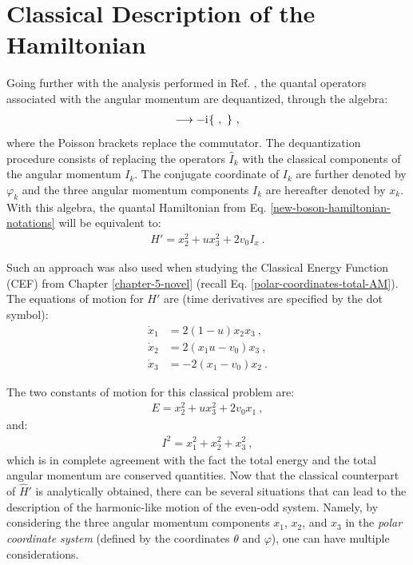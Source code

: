\section{Classical Description of the Hamiltonian}
\label{classical-description-new-boson-section}

Going further with the analysis performed in Ref. \cite{raduta2020new}, the quantal operators associated with the angular momentum are dequantized, through the algebra:
\begin{align}
    [\ ,\ ] \longrightarrow -\iu\{\ ,\ \}\ ,
\end{align}
where the Poisson brackets replace the commutator. The dequantization procedure consists of replacing the operators $\hat{I}_k$ with the classical components of the angular momentum $I_k$. The conjugate coordinate of $I_k$ are further denoted by $\varphi_k$ and the three angular momentum components $I_k$ are hereafter denoted by $x_k$. With this algebra, the quantal Hamiltonian from Eq. \ref{new-boson-hamiltonian-notations} will be equivalent to:
\begin{align}
    H'=x_2^2+ux_3^2+2v_0I_x\ .
    \label{new-boson-h-prime-classical}
\end{align}

Such an approach was also used when studying the Classical Energy Function (CEF) from Chapter \ref{chapter-5-novel} (recall Eq. \ref{polar-coordinates-total-AM}). The equations of motion for $H'$ are (time derivatives are specified by the dot symbol):
\begin{align}
    \dot{x}_1&=2(1-u)x_2x_3\ ,\nonumber\\
    \dot{x}_2&=2(x_1u-v_0)x_3\ ,\nonumber\\
    \dot{x}_3&=-2(x_1-v_0)x_2\ .
\end{align}

The two constants of motion for this classical problem are:
\begin{align}
    E=x_2^2+ux_3^2+2v_0x_1\ ,
\end{align}
and:
\begin{align}
    I^2=x_1^2+x_2^2+x_3^2\ ,
\end{align}
which is in complete agreement with the fact the total energy and the total angular momentum are conserved quantities. Now that the classical counterpart of $\hat{H}'$ is analytically obtained, there can be several situations that can lead to the description of the harmonic-like motion of the even-odd system. Namely, by considering the three angular momentum components $x_1$, $x_2$, and $x_3$ in the \emph{polar coordinate system} (defined by the coordinates $\theta$ and $\varphi$), one can have multiple considerations.

